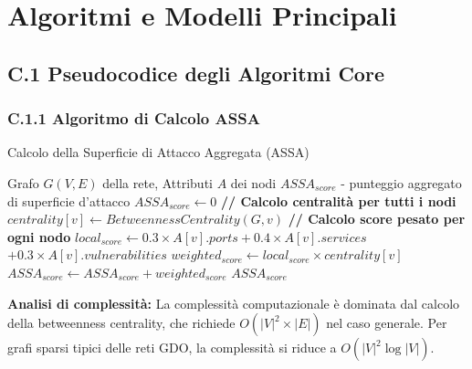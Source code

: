 
\chapter{\texorpdfstring{\textbf{Algoritmi e Modelli Principali}}{Appendice C - Algoritmi e Modelli Principali}}
\label{app:algoritmi}

\newtheorem{theorem}{Teorema}

\section{\texorpdfstring{\textbf{C.1 Pseudocodice degli Algoritmi Core}}{C.1 - Pseudocodice degli Algoritmi Core}}

\subsection{\texorpdfstring{\textbf{C.1.1 Algoritmo di Calcolo ASSA}}{C.1.1 - Algoritmo di Calcolo ASSA}}

\begin{algorithm}
\caption{Calcolo della Superficie di Attacco Aggregata (ASSA)}
\label{alg:assa}
\begin{algorithmic}
\Require Grafo $G(V,E)$ della rete, Attributi $A$ dei nodi
\Ensure $ASSA_{score}$ - punteggio aggregato di superficie d'attacco
\State $ASSA_{score} \gets 0$
\State \textbf{// Calcolo centralità per tutti i nodi}
    \State $centrality[v] \gets BetweennessCentrality(G, v)$
\EndFor
\State \textbf{// Calcolo score pesato per ogni nodo}
    \State $local_{score} \gets 0.3 \times A[v].ports + 0.4 \times A[v].services$
    \State \hspace{2.3cm} $+ 0.3 \times A[v].vulnerabilities$
    \State $weighted_{score} \gets local_{score} \times centrality[v]$
    \State $ASSA_{score} \gets ASSA_{score} + weighted_{score}$
\EndFor
\State \Return $ASSA_{score}$
\end{algorithmic}
\end{algorithm}

\textbf{Analisi di complessità:} La complessità computazionale è dominata dal calcolo della betweenness centrality, che richiede $O(|V|^2 \times |E|)$ nel caso generale. Per grafi sparsi tipici delle reti GDO, la complessità si riduce a $O(|V|^2 \log |V|)$.

